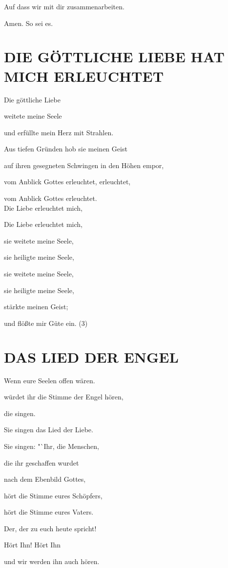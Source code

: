 \documentclass[11pt,a5paper,twoside]{article}
\begin{document}
Auf dass wir mit dir zusammenarbeiten. 

Amen. So sei es. 


\section[Die göttliche Liebe hat mich erleuchtet]{DIE GÖTTLICHE LIEBE HAT MICH ERLEUCHTET}

Die göttliche Liebe 

weitete meine Seele

und erfüllte mein Herz mit Strahlen.

Aus tiefen Gründen hob sie meinen Geist

auf ihren gesegneten Schwingen in den Höhen empor, 

vom Anblick Gottes erleuchtet, erleuchtet,

vom Anblick Gottes erleuchtet. \\


Die Liebe erleuchtet mich, 

Die Liebe erleuchtet mich,

sie weitete meine Seele, 

sie heiligte meine Seele, 

sie weitete meine Seele, 

sie heiligte meine Seele, 

stärkte meinen Geist; 

und flößte mir Güte ein. (3)

\section[Das Lied der Engel]{DAS LIED DER ENGEL}

Wenn eure Seelen offen wären.

würdet ihr die Stimme der Engel hören,

die singen.

Sie singen das Lied der Liebe.

Sie singen: "`Ihr, die Menschen,

die ihr geschaffen wurdet

nach dem Ebenbild Gottes,

hört die Stimme eures Schöpfers,

hört die Stimme eures Vaters.

Der, der zu euch heute spricht!

Hört Ihn! Hört Ihn

und wir werden ihn auch hören.
\end{document}
